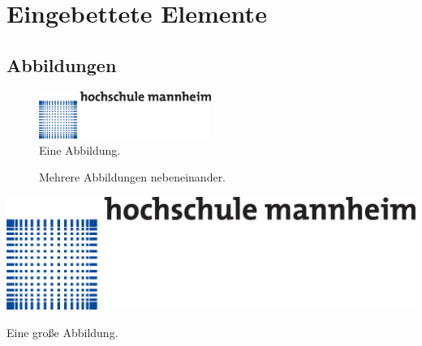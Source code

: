 \section{Eingebettete Elemente}

\subsection{Abbildungen}

\begin{figure}[h]
	\centering
	\includegraphics[width=0.5\textwidth]{Abbildungen/Logo.eps}
	\caption{Eine Abbildung.}
	\label{figure:Logo1}
\end{figure}

\begin{figure}[h]
	\centering
	\hfill
	\hfill
	\caption{Mehrere Abbildungen nebeneinander.}
	\label{figure:Logo2}
\end{figure}

\begin{table}
	\centering
	\includegraphics[scale=0.3]{Abbildungen/Logo.eps}
	\caption{Eine große Abbildung.}
	\label{figure:Logo3}
\end{table}

